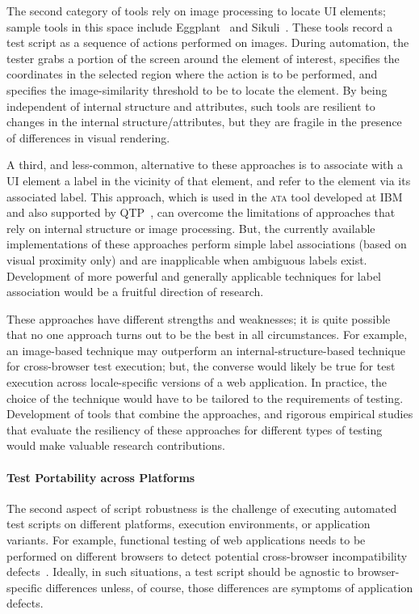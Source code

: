 The second category of tools rely on image processing to locate UI elements;
sample tools in this space include Eggplant~\cite{Eggplant} and
Sikuli~\cite{Chang:2010, Yeh:2009}. These tools record a test script as a
sequence of actions performed on images. During automation, the tester grabs a
portion of the screen around the element of interest, specifies the coordinates
in the selected region where the action is to be performed, and specifies the
image-similarity threshold to be to locate the element. By being independent of
internal structure and attributes, such tools are resilient to changes in the
internal structure/attributes, but they are fragile in the presence of
differences in visual rendering. %

A third, and less-common, alternative to these approaches is to associate with a
UI element a label in the vicinity of that element, and refer to the element via
its associated label. This approach, which is used in the \textsc{ata} tool
developed at IBM~\cite{thummalapenta:2012b, thummalapenta:2012a,
  thummalapenta:2013a} and also supported by QTP~\cite{hpqtp}, can overcome the
limitations of approaches that rely on internal structure or image
processing. But, the currently available implementations of these approaches
perform simple label associations (based on visual proximity only) and are
inapplicable when ambiguous labels exist. Development of more powerful and
generally applicable techniques for label association would be a fruitful
direction of research.

These approaches have different strengths and weaknesses; it is quite possible
that no one approach turns out to be the best in all circumstances. For example,
an image-based technique may outperform an internal-structure-based technique
for cross-browser test execution; but, the converse would likely be true for
test execution across locale-specific versions of a web application. In
practice, the choice of the technique would have to be tailored to the
requirements of testing.  Development of tools that combine the approaches, and
rigorous empirical studies that evaluate the resiliency of these approaches for
different types of testing would make valuable research contributions.

\vskip -5pt
\paragraph*{Test Portability across Platforms} The second aspect of script robustness is the
challenge of executing automated test scripts on different platforms, execution
environments, or application variants.  For example, functional testing of web
applications needs to be performed on different browsers to detect potential
cross-browser incompatibility
defects~\cite{Choudhary2010,Shauvik:2012,Choudhary:2013,Mesbah:2011}. Ideally,
in such situations, a test script should be agnostic to browser-specific
differences unless, of course, those differences are symptoms of application
defects.

